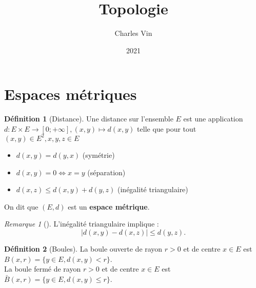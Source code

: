 \documentclass{article}
\title{Topologie}
\author{Charles Vin}
\date{2021}
\theoremstyle{plain}%
\theoremstyle{definition}
\newtheorem{defn}{Définition}[section]
\theoremstyle{remark}
\newtheorem*{rem}{Remarque}
\begin{document}
\maketitle

\section{Espaces métriques}
\begin{defn}[Distance]
    Une distance sur l'ensemble $ E $ est une application $ d: E \times E \to [0;+\infty ], (x,y) \mapsto d(x,y) $ telle que pour tout $ (x,y) \in E^2, x,y,z \in E $ 
    \begin{itemize}
        \item $ d(x,y) = d(y,x)$ (symétrie)
        \item $ d(x,y) = 0 \Leftrightarrow x=y $ (séparation)
        \item $ d(x,z) \leq d(x,y) + d(y,z) $ (inégalité triangulaire)
    \end{itemize}
    On dit que $ (E, d) $ est un \textbf{espace métrique}.
\end{defn}
\begin{rem}[]
    L'inégalité triangulaire implique : 
    \[
        \left| d(x,y) - d(x,z) \right| \leq d(y,z)
    .\]
\end{rem}


\begin{defn}[Boules]
    La boule ouverte de rayon $ r>0 $ et de centre $ x \in E$ est $ B(x,r) = \{y \in E, d(x,y) < r\} $. \\
    La boule fermé de rayon $ r>0 $ et de centre $ x \in E$ est $ \bar{B}(x,r) = \{y \in E, d(x,y) \leq  r\} $. \\
\end{defn}
\end{document}
